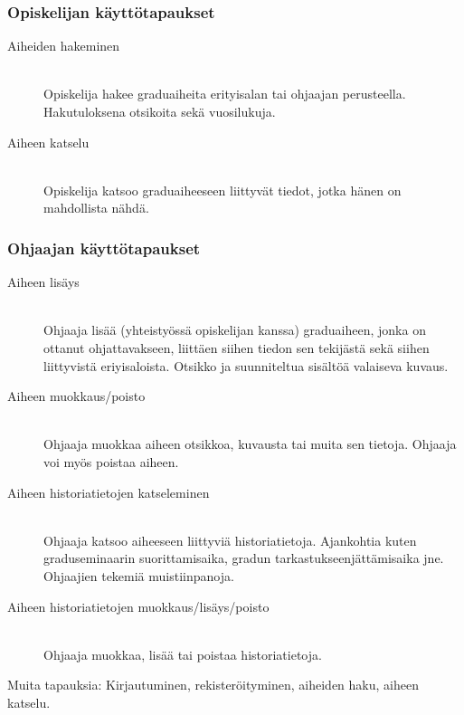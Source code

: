 \documentclass[11pt,a4paper,finnish,oneside]{article}
\begin{document}
\begin{par}

\subsubsection{Opiskelijan käyttötapaukset}

\begin{description}
  \item[Aiheiden hakeminen]\hfill\\Opiskelija hakee graduaiheita erityisalan tai ohjaajan perusteella. Hakutuloksena otsikoita sekä vuosilukuja.
  \item[Aiheen katselu]\hfill\\Opiskelija katsoo graduaiheeseen liittyvät tiedot, jotka hänen on mahdollista nähdä. 
\end{description}

\subsubsection{Ohjaajan käyttötapaukset}

\begin{description}
  \item[Aiheen lisäys]\hfill\\Ohjaaja lisää (yhteistyössä opiskelijan kanssa) graduaiheen, jonka on ottanut ohjattavakseen, liittäen siihen tiedon sen tekijästä sekä siihen liittyvistä eriyisaloista. Otsikko ja suunniteltua sisältöä valaiseva kuvaus.

  \item[Aiheen muokkaus/poisto]\hfill\\Ohjaaja muokkaa aiheen otsikkoa, kuvausta tai muita sen tietoja. Ohjaaja voi myös poistaa aiheen.

  \item[Aiheen historiatietojen katseleminen]\hfill\\Ohjaaja katsoo aiheeseen liittyviä historiatietoja. Ajankohtia kuten graduseminaarin suorittamisaika, gradun tarkastukseenjättämisaika jne. Ohjaajien tekemiä muistiinpanoja.
  
    \item[Aiheen historiatietojen muokkaus/lisäys/poisto]\hfill\\Ohjaaja muokkaa, lisää tai poistaa historiatietoja. 
  
\end{description}
Muita tapauksia: Kirjautuminen, rekisteröityminen, aiheiden haku, aiheen katselu.

\end{par}\vspace{1em}
\end{document}
